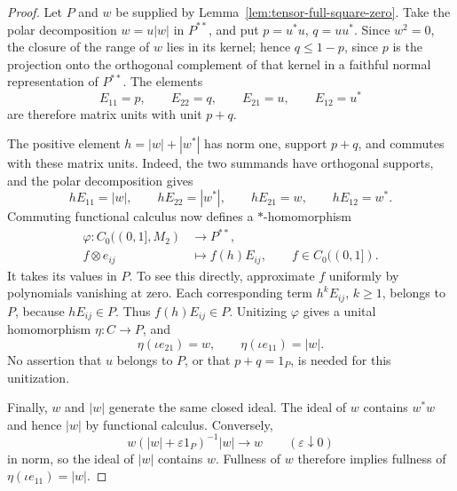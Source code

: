 \begin{proof}
Let \(P\) and \(w\) be supplied by
Lemma~\ref{lem:tensor-full-square-zero}. Take the polar decomposition
\(w=u|w|\) in \(P^{**}\), and put \(p=u^*u\), \(q=uu^*\).
Since \(w^2=0\), the closure of the range of \(w\) lies in its kernel;
hence \(q\le1-p\), since \(p\) is the projection onto the orthogonal
complement of that kernel in a faithful normal representation of \(P^{**}\).
The elements
\[
           E_{11}=p,\qquad E_{22}=q,\qquad
           E_{21}=u,\qquad E_{12}=u^*
\]
are therefore matrix units with unit \(p+q\).

The positive element \(h=|w|+|w^*|\) has norm one, support \(p+q\),
and commutes with these matrix units. Indeed, the two summands have
orthogonal supports, and the polar decomposition gives
\[
 hE_{11}=|w|,\qquad hE_{22}=|w^*|,\qquad
 hE_{21}=w,\qquad hE_{12}=w^*.
\]
Commuting functional calculus now defines a \(*\)-homomorphism
\[
 \begin{split}
 \varphi:C_0((0,1],M_2)&\longrightarrow P^{**},\\
 f\otimes e_{ij}&\longmapsto f(h)E_{ij},
       \qquad f\in C_0((0,1]).
 \end{split}
\]
It takes its values in \(P\). To see this directly, approximate \(f\)
uniformly by polynomials vanishing at zero. Each corresponding
term \(h^kE_{ij}\), \(k\ge1\), belongs to \(P\), because
\(hE_{ij}\in P\). Thus \(f(h)E_{ij}\in P\).
Unitizing \(\varphi\) gives a unital homomorphism \(\eta:C\to P\),
and
\[
                  \eta(\iota e_{21})=w,\qquad
                  \eta(\iota e_{11})=|w|.
\]
No assertion that \(u\) belongs to \(P\), or that \(p+q=1_P\), is
needed for this unitization.

Finally, \(w\) and \(|w|\) generate the same closed ideal.
The ideal of \(w\) contains \(w^*w\) and hence \(|w|\) by functional
calculus. Conversely,
\[
          w(|w|+\varepsilon1_P)^{-1}|w|\longrightarrow w
          \qquad(\varepsilon\downarrow0)
\]
in norm, so the ideal of \(|w|\) contains \(w\).
Fullness of \(w\) therefore implies fullness of
\(\eta(\iota e_{11})=|w|\).
\end{proof}
